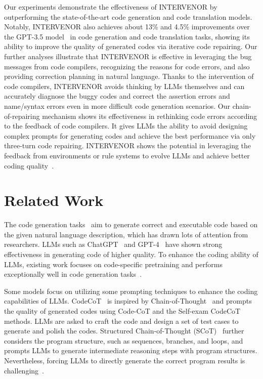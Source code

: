 \documentclass[11pt]{article}
\begin{document}
Our experiments demonstrate the effectiveness of INTERVENOR by outperforming the state-of-the-art code generation and code translation models. Notably, INTERVENOR also achieves about 13\% and 4.5\% improvements over the GPT-3.5 model~\cite{chatgpt} in code generation and code translation tasks, showing its ability to improve the quality of generated codes via iterative code repairing. Our further analyses illustrate that INTERVENOR is effective in leveraging the bug messages from code compilers, recognizing the reasons for code errors, and also providing correction planning in natural language. Thanks to the intervention of code compilers, INTERVENOR avoids thinking by LLMs themselves and can accurately diagnose the buggy codes and correct the assertion errors and name/syntax errors even in more difficult code generation scenarios. Our chain-of-repairing mechanism shows its effectiveness in rethinking code errors according to the feedback of code compilers. It gives LLMs the ability to avoid designing complex prompts for generating codes and achieve the best performance via only three-turn code repairing. INTERVENOR shows the potential in leveraging the feedback from environments or rule systems to evolve LLMs and achieve better coding quality~\cite{Olausson2023IsSA}.

 


\section{Related Work}
The code generation tasks~\cite{chen2021evaluating,austin2021program,zheng2023codegeex} aim to generate correct and executable code based on the given natural language description, which has drawn lots of attention from researchers. LLMs such as ChatGPT~\cite{chatgpt} and GPT-4~\cite{openai2023gpt4} have shown strong effectiveness in generating code of higher quality. To enhance the coding ability of LLMs, existing work focuses on code-specific pretraining and performs exceptionally well in code generation tasks~\cite{roziere2023code,li2023starcoder,luo2023wizardcoder,wang2023codet5+}.

Some models focus on utilizing some prompting techniques to enhance the coding capabilities of LLMs. CodeCoT~\cite{huang2023codecot} is inspired by Chain-of-Thought~\cite{wei2023chainofthought} and prompts the quality of generated codes using Code-CoT and the Self-exam CodeCoT methods. LLMs are asked to craft the code and design a set of test cases to generate and polish the codes. Structured Chain-of-Thought (SCoT)~\cite{li2023structured} further considers the program structure, such as sequences, branches, and loops, and prompts LLMs to generate intermediate reasoning steps with program structures. Nevertheless, forcing LLMs to directly generate the correct program results is challenging~\cite{chen2023teaching}.
\end{document}

